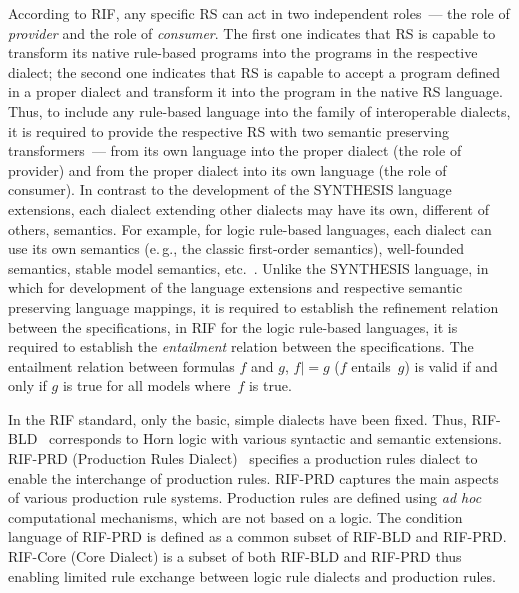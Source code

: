 \begin{multicols}{2}
  According to RIF, any specific RS can act in two independent roles~--- the role of
\textit{provider} and the role of \textit{consumer}. The first one indicates that RS is
capable to transform its native rule-based programs into the programs in the
respective dialect; the second one indicates that RS is capable to accept a program
defined in a proper dialect and transform it into the program in the native RS
language. Thus, to include any rule-based language into the family of interoperable
dialects, it is required to provide the respective RS with two semantic preserving
transformers~--- from its own language into the proper dialect (the role of provider) and
from the proper dialect into its own language (the role of consumer). In contrast to the
development of the SYNTHESIS language extensions, each dialect extending other
dialects may have its own, different of others, semantics. For example, for logic rule-based
languages, each dialect can use its own semantics (e.\,g., the classic first-order
semantics), well-founded semantics, stable model semantics, etc.~\cite{14-kal}.
Unlike the SYNTHESIS language, in which for development of the language
extensions and respective semantic preserving language mappings, it is required to
establish the refinement relation between the specifications, in RIF for the logic
rule-based languages, it is required to establish the \textit{entailment} relation between the
specifications. The entailment relation between formulas $f$ and $g$, $f\vert =g$ ($f$ entails~$g$)
is valid if and only if $g$ is true for all models
where~$f$ is true.

  In the RIF standard, only the basic, simple dialects have been fixed. Thus,
  RIF-BLD~\cite{20-kal} corresponds to Horn logic with
various syntactic and semantic extensions. RIF-PRD (Production Rules
Dialect)~\cite{21-kal} specifies a production rules dialect to enable the interchange of
production rules. RIF-PRD captures the main aspects of various production rule
systems. Production rules are defined using \textit{ad hoc} computational mechanisms, which
are not based on a logic. The condition language of RIF-PRD is defined as a common
subset of RIF-BLD and RIF-PRD. RIF-Core (Core Dialect) is a subset of both
  RIF-BLD and RIF-PRD thus enabling limited rule exchange between logic rule
dialects and production rules.


\end{multicols}
